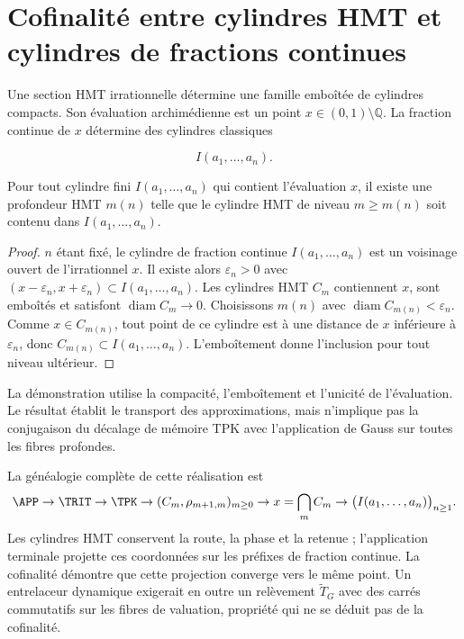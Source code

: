 \label{ch:gauss}

\section{Cofinalité entre cylindres HMT et cylindres de fractions continues}

Une section HMT irrationnelle détermine une famille emboîtée de cylindres compacts. Son évaluation archimédienne est un point \(x\in(0,1)\setminus\mathbb Q\). La fraction continue de \(x\) détermine des cylindres classiques

\[
I(a_1,\ldots,a_n).
\]

\begin{proposition}[Cofinalité]
Pour tout cylindre fini \(I(a_1,\ldots,a_n)\) qui contient l'évaluation \(x\), il existe une profondeur HMT \(m(n)\) telle que le cylindre HMT de niveau \(m\ge m(n)\) soit contenu dans \(I(a_1,\ldots,a_n)\).
\end{proposition}

\begin{proof}
\(n\) étant fixé, le cylindre de fraction continue \(I(a_1,\ldots,a_n)\) est un voisinage ouvert de l'irrationnel \(x\). Il existe alors \(\varepsilon_n>0\) avec \((x-\varepsilon_n,x+\varepsilon_n)\subset I(a_1,\ldots,a_n)\). Les cylindres HMT \(C_m\) contiennent \(x\), sont emboîtés et satisfont \(\operatorname{diam}C_m\to0\). Choisissons \(m(n)\) avec \(\operatorname{diam}C_{m(n)}<\varepsilon_n\). Comme \(x\in C_{m(n)}\), tout point de ce cylindre est à une distance de \(x\) inférieure à \(\varepsilon_n\), donc \(C_{m(n)}\subset I(a_1,\ldots,a_n)\). L'emboîtement donne l'inclusion pour tout niveau ultérieur.
\end{proof}

La démonstration utilise la compacité, l'emboîtement et l'unicité de
l'évaluation. Le résultat établit le transport des approximations, mais
n'implique pas la conjugaison du décalage de mémoire TPK avec l'application de
Gauss sur toutes les fibres profondes.

La généalogie complète de cette réalisation est
\[
\APP\to\TRIT\to\TPK
\to (C_m,\rho_{m+1,m})_{m\ge0}
\to x=\bigcap_m C_m
\to \bigl(I(a_1,\ldots,a_n)\bigr)_{n\ge1}.
\]
Les cylindres HMT conservent la route, la phase et la retenue ; l'application terminale projette
ces coordonnées sur les préfixes de fraction continue. La cofinalité
démontre que cette projection converge vers le même point. Un entrelaceur
dynamique exigerait en outre un relèvement \(\widetilde T_G\) avec des
carrés commutatifs sur les fibres de valuation, propriété qui ne se
déduit pas de la cofinalité.

